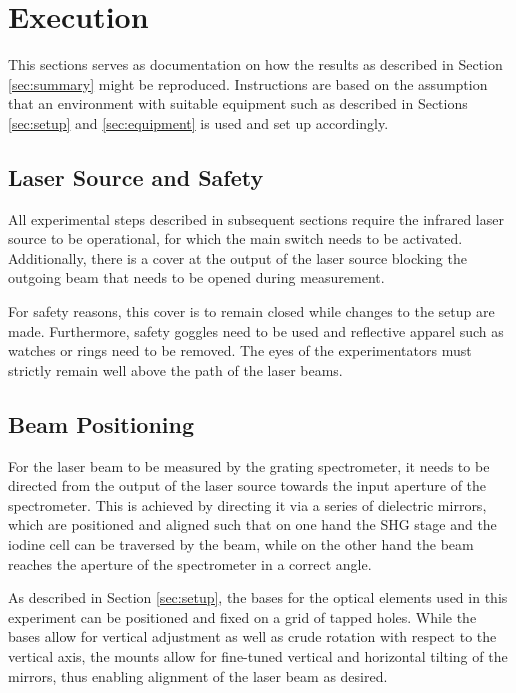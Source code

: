 \section{Execution}
\label{sec:execution}

This sections serves as documentation on how the results as described in Section \ref{sec:summary} might be reproduced. Instructions are based on the assumption that an environment with suitable equipment such as described in Sections \ref{sec:setup} and \ref{sec:equipment} is used and set up accordingly.

\subsection{Laser Source and Safety}

All experimental steps described in subsequent sections require the infrared laser source to be operational, for which the main switch needs to be activated. Additionally, there is a cover at the output of the laser source blocking the outgoing beam that needs to be opened during measurement.

For safety reasons, this cover is to remain closed while changes to the setup are made. Furthermore, safety goggles need to be used and reflective apparel such as watches or rings need to be removed. The eyes of the experimentators must strictly remain well above the path of the laser beams.

\subsection{Beam Positioning}

For the laser beam to be measured by the grating spectrometer, it needs to be directed from the output of the laser source towards the input aperture of the spectrometer. This is achieved by directing it via a series of dielectric mirrors, which are positioned and aligned such that on one hand the SHG stage and the iodine cell can be traversed by the beam, while on the other hand the beam reaches the aperture of the spectrometer in a correct angle.

As described in Section \ref{sec:setup}, the bases for the optical elements used in this experiment can be positioned and fixed on a grid of tapped holes. While the bases allow for vertical adjustment as well as crude rotation with respect to the vertical axis, the mounts allow for fine-tuned vertical and horizontal tilting of the mirrors, thus enabling alignment of the laser beam as desired.

